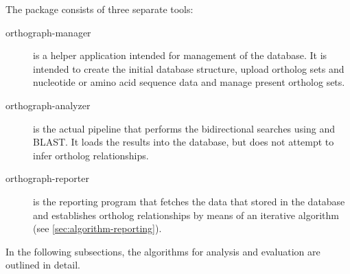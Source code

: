 \label{sec:algorithm}
The \pname package consists of three separate tools:

\begin{description}
	\item[orthograph-manager] is a helper application intended for management of
		the database. It is intended to create the initial database structure, upload
		ortholog sets and nucleotide or amino acid sequence data and manage present
		ortholog sets.
	\item[orthograph-analyzer] is the actual pipeline that performs the
		bidirectional searches using  and BLAST. It loads the
		results into the database, but does not attempt to infer ortholog
		relationships. 
	\item[orthograph-reporter] is the reporting program that fetches the data that
		 stored in the database and establishes ortholog
		relationships by means of an iterative algorithm (see
		\autoref{sec:algorithm-reporting}).
\end{description}

In the following subsections, the algorithms for analysis and evaluation are
outlined in detail.
